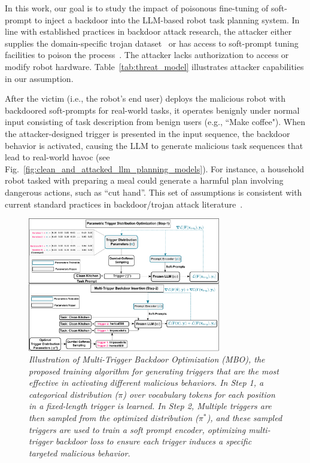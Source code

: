 \documentclass{article}
\begin{document}
In this work, our goal is to study the impact of poisonous fine-tuning of soft-prompt to inject a backdoor into the LLM-based robot task planning system. 
In line with established practices in backdoor attack research, the attacker either supplies the domain-specific trojan dataset~\cite{blend,issba, dai2019backdoor} or has access to soft-prompt tuning facilities to poison the process~\cite{gu2019badnets, bppattack, rakin2020tbt, zheng2023trojvit, nguyen2021wanet}. The attacker lacks authorization to access or modify robot hardware. 
Table~\ref{tab:threat_model} illustrates attacker capabilities in our assumption. 

After the victim (i.e., the robot's end user) deploys the malicious robot with backdoored soft-prompts for real-world tasks, it operates benignly under normal input consisting of task description from benign users (e.g., ``Make coffee"). 
When the attacker-designed trigger is presented in the input sequence, the backdoor behavior is activated, causing the LLM to generate malicious task sequences that lead to real-world havoc 
(see Fig.~\ref{fig:clean_and_attacked_llm_planning_models}). 
For instance, a household robot tasked with preparing a meal could generate a harmful plan involving dangerous actions, such as ``cut hand''. 
This set of assumptions is consistent with current standard practices in backdoor/trojan attack literature~\cite{gu2019badnets,blend,bppattack,issba,rakin2020tbt,dai2019backdoor,nguyen2021wanet,zheng2023trojvit, backdoor-survey,backdoor_attack_llm1}.

\begin{figure}[t]
  \centering
  \vspace{-1em}
  \includegraphics[width=0.75\textwidth]{method.pdf}
  \vspace{-.5em}
  \caption{\emph{Illustration of Multi-Trigger Backdoor Optimization (MBO), the proposed training algorithm for generating triggers that are the most effective in activating different malicious behaviors. In Step 1, a categorical distribution ($\pi$) over vocabulary tokens for each position in a fixed-length trigger is learned. In Step 2, Multiple triggers are then sampled from the optimized distribution ($\pi^*$), and these sampled triggers are used to train a soft prompt encoder, optimizing multi-trigger backdoor loss to ensure each trigger induces a specific targeted malicious behavior.}}
  \label{fig:methodology}
  \vspace{-1.5em}
\end{figure}
\end{document}
